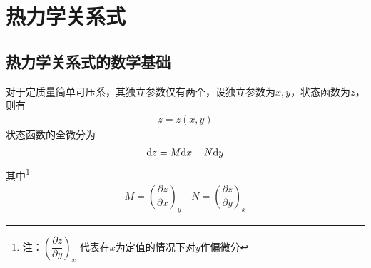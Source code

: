 \chapter{热力学关系式}
\thispagestyle{empty}

\section{热力学关系式的数学基础}
对于定质量简单可压系，其独立参数仅有两个，设独立参数为$x,y$，状态函数为$z$，则有
\begin{align}
	z= z (x, y)
\end{align}
状态函数的全微分为
\begin{align}
	{\rm{d}} z = M {\rm{d}} x + N {\rm{d}} y
\end{align}
其中\footnote{注：$ \left(\dfrac{\partial z}{\partial y} \right)_x$ 代表在$x$为定值的情况下对$y$作偏微分}
\begin{align}
	M = \left(\dfrac{\partial z}{\partial x}\right)_y  \quad  N = \left(\dfrac{\partial z}{\partial y} \right)_x
\end{align}

